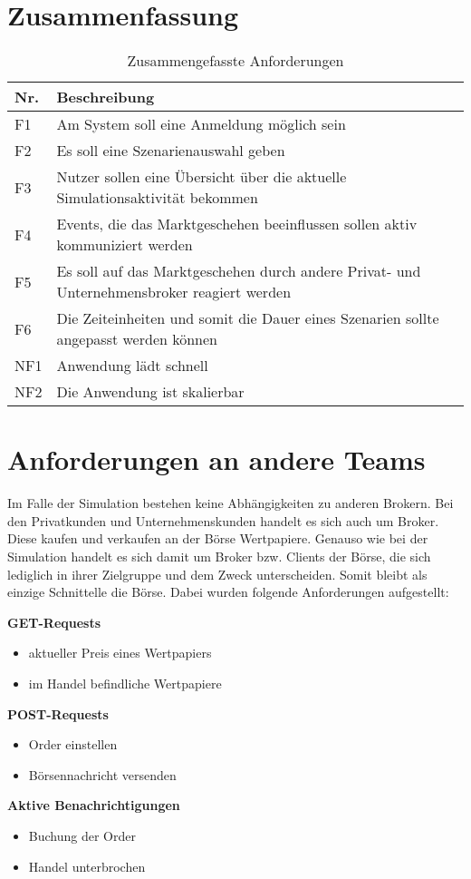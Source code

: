 \section{Zusammenfassung}
	\begin{table}[ht!]
		\centering
		\begin{tabularx}{.8\textwidth}{l|X}
			Nr.     & Beschreibung                              \\\hline
			F1      & Am System soll eine Anmeldung möglich sein                  \\
			F2		& Es soll eine Szenarienauswahl geben \\
			F3      & Nutzer sollen eine Übersicht über die aktuelle Simulationsaktivität bekommen  \\
			F4      & Events, die das Marktgeschehen beeinflussen sollen aktiv kommuniziert werden  \\
			F5      & Es soll auf das Marktgeschehen durch andere Privat- und Unternehmensbroker reagiert werden  \\
			F6      & Die Zeiteinheiten und somit die Dauer eines Szenarien sollte angepasst werden können  \\\hline
			NF1     & Anwendung lädt schnell                    \\
			NF2     & Die Anwendung ist skalierbar                \\
		\end{tabularx}
		\caption{Zusammengefasste Anforderungen}
		\label{tab:anforderungen}
	\end{table}



\section{Anforderungen an andere Teams}\label{sec:otherTeams}
	Im Falle der Simulation bestehen keine Abhängigkeiten zu anderen Brokern. Bei den Privatkunden und Unternehmenskunden handelt es sich auch um Broker.
	Diese kaufen und verkaufen an der Börse Wertpapiere. Genauso wie bei der Simulation handelt es sich damit um Broker bzw. Clients der Börse, die sich lediglich in ihrer Zielgruppe und dem Zweck unterscheiden. Somit bleibt als einzige Schnittelle die Börse. Dabei wurden folgende Anforderungen aufgestellt:
	
	\textbf{GET-Requests}
		\begin{itemize}
			\item aktueller Preis eines Wertpapiers
			\item im Handel befindliche Wertpapiere
		\end{itemize}
	\textbf{POST-Requests}
		\begin{itemize}
			\item Order einstellen
			\item Börsennachricht versenden
		\end{itemize}
	\textbf{Aktive Benachrichtigungen}
		\begin{itemize}
			\item Buchung der Order
			\item Handel unterbrochen
		\end{itemize}

